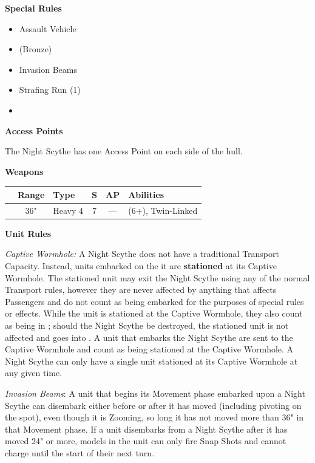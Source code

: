 \begin{minipage}[t]{0.72\textwidth}
\begin{minipage}[t]{0.5\textwidth}
\begin{flushleft}
			\textbf{Special Rules}
			\begin{itemize}
				\item Assault Vehicle
				\item {} (Bronze)
				\item Invasion Beams
				\item Strafing Run (1)
				\item {}
			\end{itemize}
		\end{flushleft}
	\end{minipage}
	
	\vspace*{2em}
	\textbf{Access Points}
	
	The Night Scythe has one Access Point on each side of the hull.
	
	\vspace*{2em}
	\textbf{Weapons}
	
	\begin{tabular}{L{90 pt} c C{40pt} *{2}{c} >{\raggedright\arraybackslash}p{130pt}}
		& Range & Type & S & AP & Abilities \\
		\hline
		 & 36" & Heavy 4 & 7 & — &  (6+), Twin-Linked
	\end{tabular}
	
	\vspace*{2em}
	\textbf{Unit Rules}
	
	\textit{Captive Wormhole:} A Night Scythe does not have a traditional Transport Capacity. Instead, units embarked on the it are \textbf{stationed} at its Captive Wormhole. The stationed unit may exit the Night Scythe using any of the normal Transport rules, however they are never affected by anything that affects Passengers and do not count as being embarked for the purposes of special rules or effects. While the unit is stationed at the Captive Wormhole, they also count as being in ; should the Night Scythe be destroyed, the stationed unit is not affected and goes into . A unit that embarks the Night Scythe are sent to the Captive Wormhole and count as being stationed at the Captive Wormhole. A Night Scythe can only have a single unit stationed at its Captive Wormhole at any given time.
	
	\textit{Invasion Beams}: A unit that begins its Movement phase embarked upon a Night Scythe can disembark either before or after it has moved (including pivoting on the spot), even though it is Zooming, so long it has not moved more than 36" in that Movement phase. If a unit disembarks from a Night Scythe after it has moved 24" or more, models in the unit can only fire Snap Shots and cannot charge until the start of their next turn.
\end{minipage}


